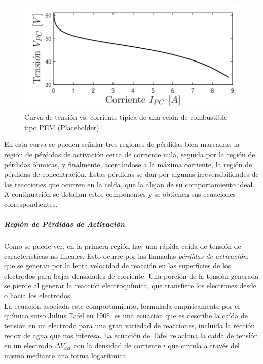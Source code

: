 \begin{figure}[h]
    \centering
    \includegraphics[scale=0.7]{Imagenes/Curva V-I Celda.png}
    \caption{Curva de tensión vs. corriente típica de una celda de combustible tipo PEM (Placeholder).}
    \label{V-I_celda}
\end{figure}

En esta curva se pueden señalar tres regiones de pérdidas bien marcadas: la región de {\Medium pérdidas de activación} cerca de corriente nula, seguida por la región de {\Medium pérdidas óhmicas}, y finalmente, acercándose a la máxima corriente, la región de {\Medium pérdidas de concentración}. Estas pérdidas se dan por algunas irreversibilidades de las reacciones que ocurren en la celda, que la alejan de su comportamiento ideal. A continuación se detallan estos componentes y se obtienen sus ecuaciones correspondientes.\\

\subparagraph{Región de Pérdidas de Activación}

Como se puede ver, en la primera región hay una rápida caída de tensión de características no lineales. Esto ocurre por las llamadas \textit{pérdidas de activación}, que se generan por la lenta velocidad de reacción en las superficies de los electrodos para bajas densidades de corriente. Una porción de la tensión generada se pierde al generar la reacción electroquímica, que transfiere los electrones desde o hacia los electrodos.\\

La ecuación asociada este comportamiento, formulada empíricamente por el químico suiso Julius Tafel en 1905, es una ecuación que es describe la caída de tensión en un electrodo para una gran variedad de reacciones, incluida la rección redox de agua que nos interesa. La ecuación de Tafel relaciona la caída de tensión en un electrodo $\Delta V_{act}$ con la densidad de corriente $i$ que circula a través del mismo mediante una forma logarítmica.
    
